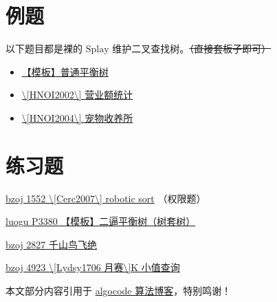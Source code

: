 
\hr

\section{例题}

以下题目都是裸的 $\text{Splay}$ 维护二叉查找树。\st{（直接套板子即可）}

\begin{itemize}
\item \href{https://www.luogu.org/problemnew/show/P3369}{【模板】普通平衡树}
\item \href{https://www.lydsy.com/JudgeOnline/problem.php?id=1588}{\textbackslash{}[HNOI2002\textbackslash{}] 营业额统计}
\item \href{https://www.lydsy.com/JudgeOnline/problem.php?id=1208}{\textbackslash{}[HNOI2004\textbackslash{}] 宠物收养所}
\end{itemize}

\section{练习题}

\href{https://www.lydsy.com/JudgeOnline/problem.php?id=1552}{bzoj 1552 \textbackslash{}[Cerc2007\textbackslash{}] robotic sort} （权限题）

\href{https://www.luogu.org/problemnew/show/P3380}{luogu P3380 【模板】二逼平衡树（树套树）}

\href{https://www.lydsy.com/JudgeOnline/problem.php?id=2827}{bzoj 2827 千山鸟飞绝}

\href{https://www.lydsy.com/JudgeOnline/problem.php?id=4923}{bzoj 4923 \textbackslash{}[Lydsy1706 月赛\textbackslash{}]K 小值查询}

\hr

\begin{QUOTE}{}{}
本文部分内容引用于 \href{https://algocode.net}{algocode 算法博客}，特别鸣谢！
\end{QUOTE}
